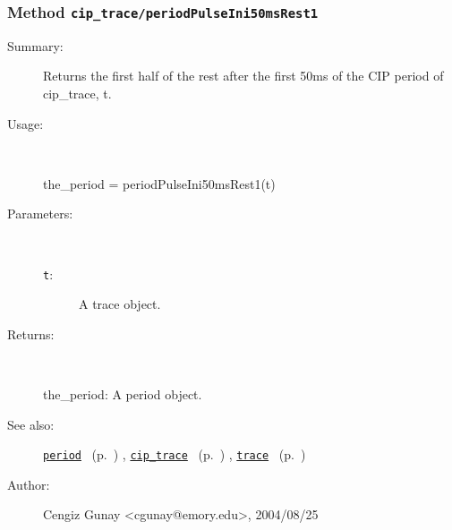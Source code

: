 \subsubsection[Method \texttt{periodPulseIni50msRest1}]{Method \texttt{cip\_trace/periodPulseIni50msRest1}}%
%
\label{ref_cip_trace__periodPulseIni50msRest1}%
\hypertarget{ref_cip_trace__periodPulseIni50msRest1}{}%
\begin{description}
\item[Summary:]Returns the first half of the rest after the 
			first 50ms of the CIP period of cip\_trace, t. 
%
\item[Usage:]~%
\begin{lyxcode}%
the\_period = periodPulseIni50msRest1(t)
%
\end{lyxcode}%
%
%
\item[Parameters:]~
\begin{description}%
\item[\texttt{t}:]
 A trace object.
\end{description}%
%
\item[Returns:]~

	the\_period: A period object.
%
%
\item[See also:]%
\hyperlink{ref_period}{\texttt{period}}%
\ (p.~\pageref{ref_period})%
%
, \hyperlink{ref_cip_trace}{\texttt{cip\_trace}}%
\ (p.~\pageref{ref_cip_trace})%
%
, \hyperlink{ref_trace}{\texttt{trace}}%
\ (p.~\pageref{ref_trace})%
%
%
\item[Author:]%
Cengiz Gunay <cgunay@emory.edu>, 2004/08/25%
\end{description}
\methodline%
